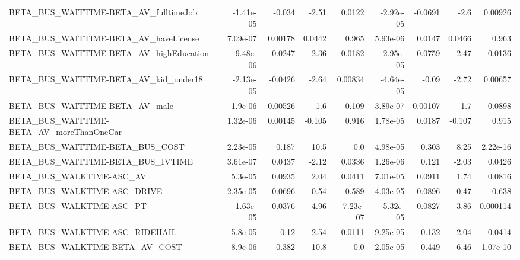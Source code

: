 \begin{tabular}{lrrrrrrrr}
BETA\_BUS\_WAITTIME-BETA\_AV\_fulltimeJob              &   -1.41e-05 &       -0.034 &    -2.51 &   0.0122 &  -2.92e-05 &     -0.0691 &         -2.6 &       0.00926 \\
BETA\_BUS\_WAITTIME-BETA\_AV\_haveLicense              &    7.09e-07 &      0.00178 &   0.0442 &    0.965 &   5.93e-06 &      0.0147 &       0.0466 &         0.963 \\
BETA\_BUS\_WAITTIME-BETA\_AV\_highEducation            &   -9.48e-06 &      -0.0247 &    -2.36 &   0.0182 &  -2.95e-05 &     -0.0759 &        -2.47 &        0.0136 \\
BETA\_BUS\_WAITTIME-BETA\_AV\_kid\_under18              &   -2.13e-05 &      -0.0426 &    -2.64 &  0.00834 &  -4.64e-05 &       -0.09 &        -2.72 &       0.00657 \\
BETA\_BUS\_WAITTIME-BETA\_AV\_male                     &    -1.9e-06 &     -0.00526 &     -1.6 &    0.109 &   3.89e-07 &     0.00107 &         -1.7 &        0.0898 \\
BETA\_BUS\_WAITTIME-BETA\_AV\_moreThanOneCar           &    1.32e-06 &      0.00145 &   -0.105 &    0.916 &   1.78e-05 &      0.0187 &       -0.107 &         0.915 \\
BETA\_BUS\_WAITTIME-BETA\_BUS\_COST                    &    2.23e-05 &        0.187 &     10.5 &      0.0 &   4.98e-05 &       0.303 &         8.25 &      2.22e-16 \\
BETA\_BUS\_WAITTIME-BETA\_BUS\_IVTIME                  &    3.61e-07 &       0.0437 &    -2.12 &   0.0336 &   1.26e-06 &       0.121 &        -2.03 &        0.0426 \\
BETA\_BUS\_WALKTIME-ASC\_AV                           &     5.3e-05 &       0.0935 &     2.04 &   0.0411 &   7.01e-05 &      0.0911 &         1.74 &        0.0816 \\
BETA\_BUS\_WALKTIME-ASC\_DRIVE                        &    2.35e-05 &       0.0696 &    -0.54 &    0.589 &   4.03e-05 &      0.0896 &        -0.47 &         0.638 \\
BETA\_BUS\_WALKTIME-ASC\_PT                           &   -1.63e-05 &      -0.0376 &    -4.96 & 7.23e-07 &  -5.32e-05 &     -0.0827 &        -3.86 &      0.000114 \\
BETA\_BUS\_WALKTIME-ASC\_RIDEHAIL                     &     5.8e-05 &         0.12 &     2.54 &   0.0111 &   9.25e-05 &       0.132 &         2.04 &        0.0414 \\
BETA\_BUS\_WALKTIME-BETA\_AV\_COST                     &     8.9e-06 &        0.382 &     10.8 &      0.0 &   2.05e-05 &       0.449 &         6.46 &      1.07e-10 \\

\end{tabular}
